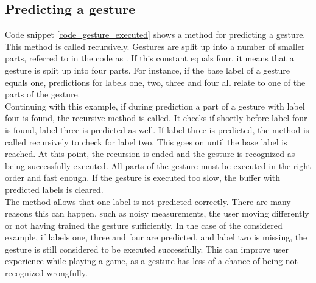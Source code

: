 \subsection{Predicting a gesture}

Code snippet \ref{code_gesture_executed} shows a method for predicting a gesture. This method is called recursively. Gestures are split up into a number of smaller parts, referred to in the code as . If this constant equals four, it means that a gesture is split up into four parts. For instance, if the base label of a gesture equals one, predictions for labels one, two, three and four all relate to one of the parts of the gesture.\\

Continuing with this example, if during prediction a part of a gesture with label four is found, the recursive method  is called. It checks if shortly before label four is found, label three is predicted as well. If label three is predicted, the method is called recursively to check for label two. This goes on until the base label is reached. At this point, the recursion is ended and the gesture is recognized as being successfully executed. All parts of the gesture must be executed in the right order and fast enough. If the gesture is executed too slow, the buffer with predicted labels is cleared.\\

The method allows that one label is not predicted correctly. There are many reasons this can happen, such as noisy measurements, the user moving differently or not having trained the gesture sufficiently. In the case of the considered example, if labels one, three and four are predicted, and label two is missing, the gesture is still considered to be executed successfully. This can improve user experience while playing a game, as a gesture has less of a chance of being not recognized wrongfully.\\


